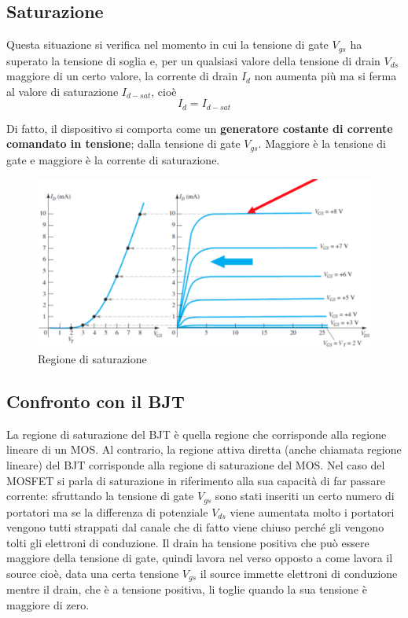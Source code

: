\documentclass[12pt, a4paper]{report}
\begin{document}
\subsection{Saturazione}
Questa situazione si verifica nel momento in cui la tensione di gate $V_{gs}$ ha superato la tensione di soglia e, per un qualsiasi valore della tensione di drain $V_{ds}$ maggiore di un certo valore, la corrente di drain $I_{d}$ non aumenta più ma si ferma al valore di saturazione $I_{d-sat}$, cioè
\begin{equation}
    I_{d} = I_{d-sat}
\end{equation}

Di fatto, il dispositivo si comporta come un \textbf{generatore costante di corrente comandato in tensione}; dalla tensione di gate $V_{gs}$. Maggiore è la tensione di gate e maggiore è la corrente di saturazione.
\begin{figure}[h]
    \centering
    \includegraphics[scale=0.37,angle=0]{n_mos_saturazione.png}
    \caption{Regione di saturazione}
\end{figure}
\subsection{Confronto con il BJT}
La regione di saturazione del BJT è quella regione che corrisponde alla regione lineare di un MOS. Al contrario, la regione attiva diretta (anche chiamata regione lineare) del BJT corrisponde alla regione di saturazione del MOS. Nel caso del MOSFET si parla di saturazione in riferimento alla sua capacità di far passare corrente: sfruttando la tensione di gate $V_{gs}$ sono stati inseriti un certo numero di portatori ma se la differenza di potenziale $V_{ds}$ viene aumentata molto i portatori vengono tutti strappati dal canale che di fatto viene chiuso perché gli vengono tolti gli elettroni di conduzione. Il drain ha tensione positiva che può essere maggiore della tensione di gate, quindi lavora nel verso opposto a come lavora il source cioè, data una certa tensione $V_{gs}$ il source immette elettroni di conduzione mentre il drain, che è a tensione positiva, li toglie quando la sua tensione è maggiore di zero.
\end{document}
